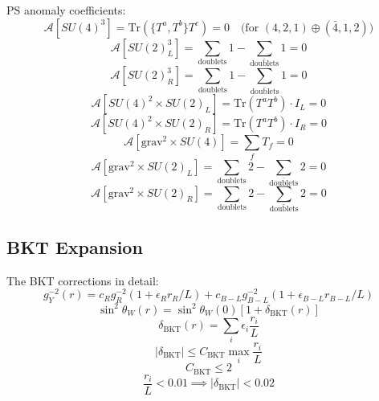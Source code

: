 \documentclass[11pt,a4paper]{article}
\begin{document}
PS anomaly coefficients:
\begin{equation}
\label{eq:ext-anom-1}
\mathcal{A}[SU(4)^3] = \text{Tr}(\{T^a, T^b\}T^c) = 0 \quad \text{(for }(4,2,1) \oplus (\bar{4},1,2)\text{)}
\end{equation}
\begin{equation}
\label{eq:ext-anom-2}
\mathcal{A}[SU(2)_L^3] = \sum_{\text{doublets}} 1 - \sum_{\bar{\text{doublets}}} 1 = 0
\end{equation}
\begin{equation}
\label{eq:ext-anom-3}
\mathcal{A}[SU(2)_R^3] = \sum_{\text{doublets}} 1 - \sum_{\bar{\text{doublets}}} 1 = 0
\end{equation}
\begin{equation}
\label{eq:ext-anom-4}
\mathcal{A}[SU(4)^2 \times SU(2)_L] = \text{Tr}(T^a T^b) \cdot I_L = 0
\end{equation}
\begin{equation}
\label{eq:ext-anom-5}
\mathcal{A}[SU(4)^2 \times SU(2)_R] = \text{Tr}(T^a T^b) \cdot I_R = 0
\end{equation}
\begin{equation}
\label{eq:ext-anom-6}
\mathcal{A}[\text{grav}^2 \times SU(4)] = \sum_f T_f = 0
\end{equation}
\begin{equation}
\label{eq:ext-anom-7}
\mathcal{A}[\text{grav}^2 \times SU(2)_L] = \sum_{\text{doublets}} 2 - \sum_{\bar{\text{doublets}}} 2 = 0
\end{equation}
\begin{equation}
\label{eq:ext-anom-8}
\mathcal{A}[\text{grav}^2 \times SU(2)_R] = \sum_{\text{doublets}} 2 - \sum_{\bar{\text{doublets}}} 2 = 0
\end{equation}

\subsection*{BKT Expansion}
\label{subsec:bkt-expansion}

The BKT corrections in detail:
\begin{equation}
\label{eq:ext-bkt-1}
g_Y^{-2}(r) = c_R g_R^{-2}(1 + \epsilon_R r_R/L) + c_{B-L} g_{B-L}^{-2}(1 + \epsilon_{B-L} r_{B-L}/L)
\end{equation}
\begin{equation}
\label{eq:ext-bkt-2}
\sin^2\theta_W(r) = \sin^2\theta_W(0)[1 + \delta_{\text{BKT}}(r)]
\end{equation}
\begin{equation}
\label{eq:ext-bkt-3}
\delta_{\text{BKT}}(r) = \sum_i \epsilon_i \frac{r_i}{L}
\end{equation}
\begin{equation}
\label{eq:ext-bkt-4}
|\delta_{\text{BKT}}| \leq C_{\text{BKT}} \max_i \frac{r_i}{L}
\end{equation}
\begin{equation}
\label{eq:ext-bkt-5}
C_{\text{BKT}} \leq 2
\end{equation}
\begin{equation}
\label{eq:ext-bkt-6}
\frac{r_i}{L} < 0.01 \implies |\delta_{\text{BKT}}| < 0.02
\end{equation}
\end{document}
